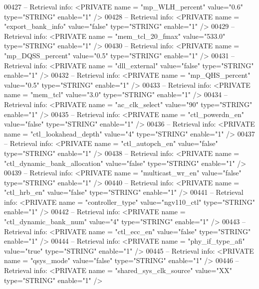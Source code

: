 \begin{DoxyCode}
{00427 \textcolor{keyword}{-- Retrieval info:      <PRIVATE name = "mp\_WLH\_percent" value="0.6"  type="STRING"  enable="1" />}
00428 \textcolor{keyword}{-- Retrieval info:      <PRIVATE name = "export\_bank\_info" value="false"  type="STRING"  enable="1" />}
00429 \textcolor{keyword}{-- Retrieval info:      <PRIVATE name = "mem\_tcl\_20\_fmax" value="533.0"  type="STRING"  enable="1" />}
00430 \textcolor{keyword}{-- Retrieval info:      <PRIVATE name = "mp\_DQSS\_percent" value="0.5"  type="STRING"  enable="1" />}
00431 \textcolor{keyword}{-- Retrieval info:      <PRIVATE name = "dll\_external" value="false"  type="STRING"  enable="1" />}
00432 \textcolor{keyword}{-- Retrieval info:      <PRIVATE name = "mp\_QHS\_percent" value="0.5"  type="STRING"  enable="1" />}
00433 \textcolor{keyword}{-- Retrieval info:      <PRIVATE name = "mem\_tcl" value="3.0"  type="STRING"  enable="1" />}
00434 \textcolor{keyword}{-- Retrieval info:      <PRIVATE name = "ac\_clk\_select" value="90"  type="STRING"  enable="1" />}
00435 \textcolor{keyword}{-- Retrieval info:      <PRIVATE name = "ctl\_powerdn\_en" value="false"  type="STRING"  enable="1" />}
00436 \textcolor{keyword}{-- Retrieval info:      <PRIVATE name = "ctl\_lookahead\_depth" value="4"  type="STRING"  enable="1" />}
00437 \textcolor{keyword}{-- Retrieval info:      <PRIVATE name = "ctl\_autopch\_en" value="false"  type="STRING"  enable="1" />}
00438 \textcolor{keyword}{-- Retrieval info:      <PRIVATE name = "ctl\_dynamic\_bank\_allocation" value="false"  type="STRING" 
       enable="1" />}
00439 \textcolor{keyword}{-- Retrieval info:      <PRIVATE name = "multicast\_wr\_en" value="false"  type="STRING"  enable="1" />}
00440 \textcolor{keyword}{-- Retrieval info:      <PRIVATE name = "ctl\_hrb\_en" value="false"  type="STRING"  enable="1" />}
00441 \textcolor{keyword}{-- Retrieval info:      <PRIVATE name = "controller\_type" value="ngv110\_ctl"  type="STRING"  enable="1" />}
00442 \textcolor{keyword}{-- Retrieval info:      <PRIVATE name = "ctl\_dynamic\_bank\_num" value="4"  type="STRING"  enable="1" />}
00443 \textcolor{keyword}{-- Retrieval info:      <PRIVATE name = "ctl\_ecc\_en" value="false"  type="STRING"  enable="1" />}
00444 \textcolor{keyword}{-- Retrieval info:      <PRIVATE name = "phy\_if\_type\_afi" value="true"  type="STRING"  enable="1" />}
00445 \textcolor{keyword}{-- Retrieval info:      <PRIVATE name = "qsys\_mode" value="false"  type="STRING"  enable="1" />}
00446 \textcolor{keyword}{-- Retrieval info:      <PRIVATE name = "shared\_sys\_clk\_source" value="XX"  type="STRING"  enable="1" />}
}
\end{DoxyCode}
